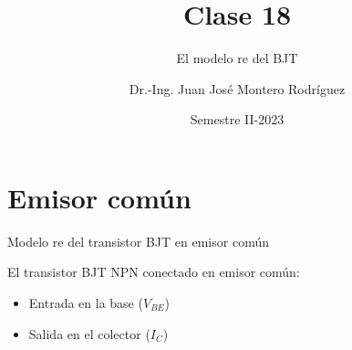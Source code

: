 \documentclass[t,aspectratio=169]{beamer}
\title{Clase 18}
\subtitle{El modelo re del BJT}
\author{Dr.-Ing. Juan José Montero Rodríguez}
\institute{Escuela de Ingeniería Electrónica}
\date{Semestre II-2023}
\begin{document}
\begin{frame}{}
\maketitle
\end{frame}

\section{Emisor común}
\begin{frame}{Modelo re del transistor BJT en emisor común}

El transistor BJT NPN conectado en emisor común:

\begin{itemize}
    \item Entrada en la base ($V_{BE}$)
    \item Salida en el colector ($I_C$)
\end{itemize}


\end{frame}
\end{document}
